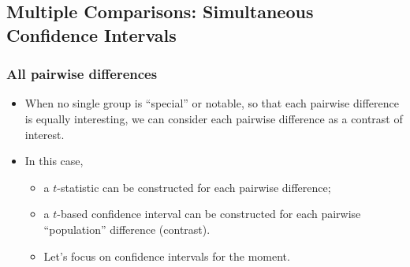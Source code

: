 \documentclass[a4paper]{article}\usepackage[]{graphicx}\usepackage[]{xcolor}
\begin{document}
\subsection{Multiple Comparisons: Simultaneous Confidence Intervals}
\subsubsection{All pairwise differences}
\begin{itemize}
	\item When no single group is ``special'' or notable, so that each pairwise difference is equally interesting, we can consider each pairwise difference as a contrast of interest.
	\item In this case,
	\begin{itemize}
		\item a \( t \)-statistic can be constructed for each pairwise difference;
		\item a \( t \)-based confidence interval can be constructed for each pairwise ``population'' difference (contrast).
		\item Let's focus on confidence intervals for the moment.
	\end{itemize}
\end{itemize}
\end{document}
